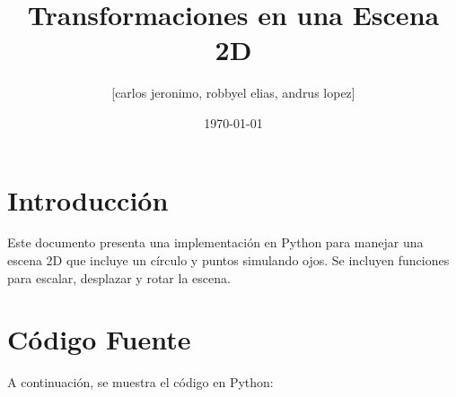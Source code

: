 \documentclass{article}
\title{Transformaciones en una Escena 2D}
\author{[carlos jeronimo, robbyel elias, andrus lopez]}
\date{\today}
\begin{document}
\maketitle

\section{Introducción}
Este documento presenta una implementación en Python para manejar una escena 2D que incluye un círculo y puntos simulando ojos. Se incluyen funciones para escalar, desplazar y rotar la escena.

\section{Código Fuente}
A continuación, se muestra el código en Python:
\end{document}
